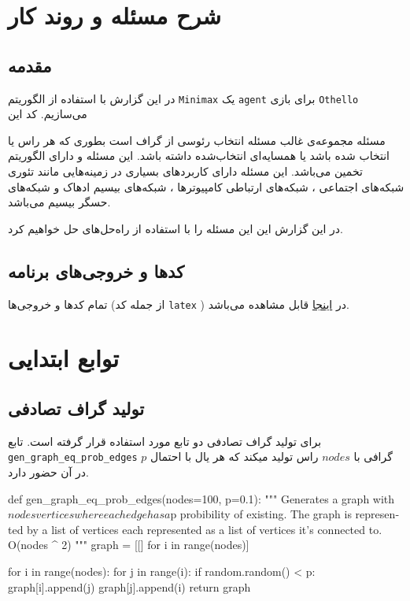 \chapter{شرح مسئله و روند کار}

\section{مقدمه}
در این گزارش با استفاده از الگوریتم 
\verb;Minimax;
یک
\verb;agent;
برای بازی
\verb;Othello;
می‌سازیم.
کد این

مسئله مجموعه‌ی غالب مسئله انتخاب رئوسی از گراف است بطوری که هر راس یا انتخاب شده باشد یا همسایه‌ای انتخاب‌شده داشته باشد. این مسئله
و دارای  الگوریتم تخمین می‌باشد.
این مسئله دارای کاربردهای بسیاری در زمینه‌هایی
 مانند تئوری شبکه‌های اجتماعی
 ، شبکه‌های ارتباطی کامپیوتر‌ها
 ، شبکه‌های بیسیم ادهاک
  و شبکه‌های حسگر بیسیم
می‌باشد.
\cite{sasireka2014applications}

در این گزارش این این مسئله را با استفاده از راه‌حل‌های 
حل خواهیم کرد.

\section{کدها و خروجی‌های برنامه}
تمام کد‌ها و خروجی‌ها (از جمله کد
\verb;latex;
)
در
\href{https://github.com/atrin-hojjat/Uni-AI-Course-Reports/blob/main/Report\%2002/}{اینجا}
قابل مشاهده می‌باشد.

\chapter{توابع ابتدایی}
\section{تولید گراف تصادفی}
برای تولید گراف تصادفی دو تابع مورد استفاده قرار گرفته است.
تابع
\verb;gen_graph_eq_prob_edges;
گرافی با
$nodes$
راس تولید میکند که هر یال با احتمال
$p$
در آن حضور دارد.
\begin{latin}
\begin{python}
def gen_graph_eq_prob_edges(nodes=100, p=0.1):
    """
    Generates a graph with $nodes vertices where each edge has a $p probibility of existing. 
    The graph is represented by a list of vertices each represented as a list of vertices it's connected to.
    O(nodes ^ 2)
    """
    graph = [[] for i in range(nodes)]

    for i in range(nodes):
        for j in range(i):
            if random.random() < p:
                graph[i].append(j)
                graph[j].append(i)
    return graph

\end{python}
\end{latin}


